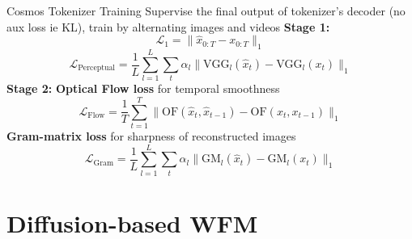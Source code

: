 \documentclass{beamer}
\begin{document}
\begin{frame}[t]{Cosmos Tokenizer Training}
    Supervise the final output of tokenizer's decoder (no aux loss ie KL), train by alternating images and videos \newline
    \textbf{Stage 1:}
    \[\mathcal{L}_1 = \| \hat{x}_{0:T} - x_{0:T} \|_1\]
    \[\mathcal{L}_{\text{Perceptual}} = \frac{1}{L} \sum_{l=1}^{L} \sum_{t} \alpha_l \| \text{VGG}_l(\hat{x}_t) - \text{VGG}_l(x_t) \|_1\]
    \textbf{Stage 2:} \newline
    \textbf{Optical Flow loss} for temporal smoothness
    \[\mathcal{L}_{\text{Flow}} = \frac{1}{T} \sum_{t=1}^{T} \| \text{OF}(\hat{x}_t, \hat{x}_{t-1}) - \text{OF}(x_t, x_{t-1}) \|_1\]    
    \textbf{Gram-matrix loss} for sharpness of reconstructed images
    \[\mathcal{L}_{\text{Gram}} = \frac{1}{L} \sum_{l=1}^{L} \sum_{t} \alpha_l \| \text{GM}_l(\hat{x}_t) - \text{GM}_l(x_t) \|_1\]
\end{frame}
\section{Diffusion-based WFM}
\end{document}

